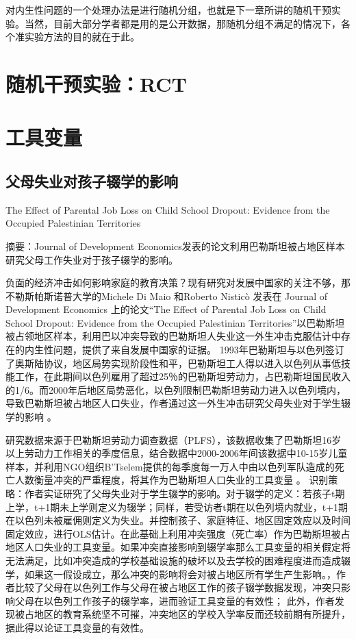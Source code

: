 \documentclass{book}
\begin{document}
\par 对内生性问题的一个处理办法是进行随机分组，也就是下一章所讲的随机干预实验。当然，目前大部分学者都是用的是公开数据，那随机分组不满足的情况下，各个准实验方法的目的就在于此。

\chapter{随机干预实验：RCT}
\chapter{工具变量}
\section{父母失业对孩子辍学的影响}
The Effect of Parental Job Loss on Child School Dropout: Evidence from the Occupied Palestinian Territories
\par 摘要：Journal of Development Economics发表的论文利用巴勒斯坦被占地区样本研究父母工作失业对于孩子辍学的影响\citep{di_maio_2019}。
\par 负面的经济冲击如何影响家庭的教育决策？现有研究对发展中国家的关注不够，那不勒斯帕斯诺普大学的Michele Di Maio 和Roberto Nisticò 发表在 Journal of Development Economics 上的论文“The Effect of Parental Job Loss on Child School Dropout: Evidence from the Occupied Palestinian Territories”以巴勒斯坦被占领地区样本，利用巴以冲突导致的巴勒斯坦人失业这一外生冲击克服估计中存在的内生性问题，提供了来自发展中国家的证据。
1993年巴勒斯坦与以色列签订了奥斯陆协议，地区局势实现阶段性和平，巴勒斯坦工人得以进入以色列从事低技能工作，在此期间以色列雇用了超过25％的巴勒斯坦劳动力，占巴勒斯坦国民收入的1/6。而2000年后地区局势恶化，以色列限制巴勒斯坦劳动力进入以色列境内，导致巴勒斯坦被占地区人口失业，作者通过这一外生冲击研究父母失业对于学生辍学的影响 。
\par 研究数据来源于巴勒斯坦劳动力调查数据（PLFS），该数据收集了巴勒斯坦16岁以上劳动力工作相关的季度信息，结合数据中2000-2006年间该数据中10-15岁儿童样本，并利用NGO组织B’Tselem提供的每季度每一万人中由以色列军队造成的死亡人数衡量冲突的严重程度，将其作为巴勒斯坦人口失业的工具变量 。
识别策略：作者实证研究了父母失业对于学生辍学的影响。对于辍学的定义：若孩子t期上学，t+1期未上学则定义为辍学；同样，若受访者t期在以色列境内就业，t+1期在以色列未被雇佣则定义为失业。并控制孩子、家庭特征、地区固定效应以及时间固定效应，进行OLS估计。在此基础上利用冲突强度（死亡率）作为巴勒斯坦被占地区人口失业的工具变量。如果冲突直接影响到辍学率那么工具变量的相关假定将无法满足，比如冲突造成的学校基础设施的破坏以及去学校的困难程度进而造成辍学，如果这一假设成立，那么冲突的影响将会对被占地区所有学生产生影响。，作者比较了父母在以色列工作与父母在被占地区工作的孩子辍学数据发现，冲突只影响父母在以色列工作孩子的辍学率，进而验证工具变量的有效性； 此外，作者发现被占地区的教育系统坚不可摧，冲突地区的学校入学率反而还较前期有所提升，据此得以论证工具变量的有效性。
\end{document}
